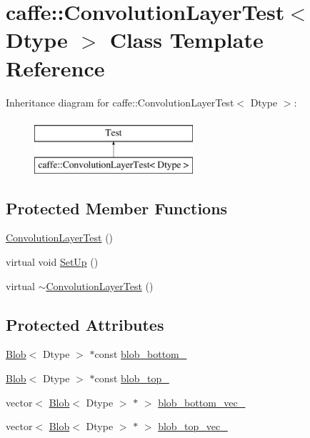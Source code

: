 \hypertarget{classcaffe_1_1_convolution_layer_test}{\section{caffe\+:\+:Convolution\+Layer\+Test$<$ Dtype $>$ Class Template Reference}
\label{classcaffe_1_1_convolution_layer_test}
}
Inheritance diagram for caffe\+:\+:Convolution\+Layer\+Test$<$ Dtype $>$\+:\begin{figure}[H]
\begin{center}
\leavevmode
\includegraphics[height=2.000000cm]{classcaffe_1_1_convolution_layer_test}
\end{center}
\end{figure}
\subsection*{Protected Member Functions}
\begin{DoxyCompactItemize}
\item 
\hyperlink{classcaffe_1_1_convolution_layer_test_a9b7ea9083334a05ed4e8391b93fe8de2}{Convolution\+Layer\+Test} ()
\item 
virtual void \hyperlink{classcaffe_1_1_convolution_layer_test_aa7eb509c8c41313e372a3bfdd0e010d0}{Set\+Up} ()
\item 
virtual \hyperlink{classcaffe_1_1_convolution_layer_test_aa819ddf3e86c7f47c71c958722051d3b}{$\sim$\+Convolution\+Layer\+Test} ()
\end{DoxyCompactItemize}
\subsection*{Protected Attributes}
\begin{DoxyCompactItemize}
\item 
\hyperlink{classcaffe_1_1_blob}{Blob}$<$ Dtype $>$ $\ast$const \hyperlink{classcaffe_1_1_convolution_layer_test_a21716aea5f577453a99d8e3b81a3d5c1}{blob\+\_\+bottom\+\_\+}
\item 
\hyperlink{classcaffe_1_1_blob}{Blob}$<$ Dtype $>$ $\ast$const \hyperlink{classcaffe_1_1_convolution_layer_test_a46f8f672a46471f36229b33353b74819}{blob\+\_\+top\+\_\+}
\item 
vector$<$ \hyperlink{classcaffe_1_1_blob}{Blob}$<$ Dtype $>$ $\ast$ $>$ \hyperlink{classcaffe_1_1_convolution_layer_test_af56ff97244fa2e368cef99244d2d9710}{blob\+\_\+bottom\+\_\+vec\+\_\+}
\item 
vector$<$ \hyperlink{classcaffe_1_1_blob}{Blob}$<$ Dtype $>$ $\ast$ $>$ \hyperlink{classcaffe_1_1_convolution_layer_test_a0e6a300a7bd189e09a979d3889b6c6ca}{blob\+\_\+top\+\_\+vec\+\_\+}
\end{DoxyCompactItemize}


